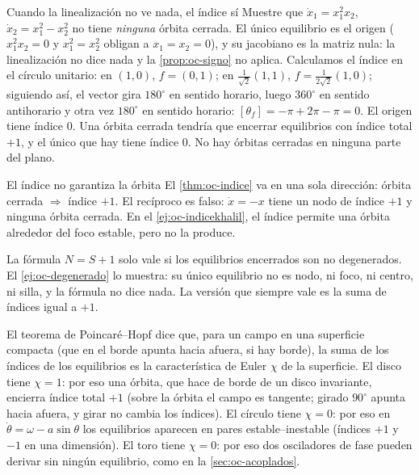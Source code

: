 \begin{ejemplo}[label=ej:oc-degenerado]{Cuando la linealización no ve nada, el índice sí}
Muestre que $\dot x_1=x_1^2x_2$, $\dot x_2=x_1^2-x_2^2$ no tiene \emph{ninguna} órbita cerrada.
\solucion El único equilibrio es el origen ($x_1^2x_2=0$ y $x_1^2=x_2^2$ obligan a $x_1=x_2=0$), y su jacobiano es la matriz nula: la linealización no dice nada y la \cref{prop:oc-signo} no aplica. Calculamos el índice en el círculo unitario: en $(1,0)$, $f=(0,1)$; en $\tfrac1{\sqrt2}(1,1)$, $f=\tfrac1{2\sqrt2}(1,0)$; siguiendo así, el vector gira $180^\circ$ en sentido horario, luego $360^\circ$ en sentido antihorario y otra vez $180^\circ$ en sentido horario: $[\theta_f]=-\pi+2\pi-\pi=0$. El origen tiene índice $0$. Una órbita cerrada tendría que encerrar equilibrios con índice total $+1$, y el único que hay tiene índice $0$. No hay órbitas cerradas en ninguna parte del plano.
\end{ejemplo}


\begin{trampa}[label=tr:oc-indice]{El índice no garantiza la órbita}
El \cref{thm:oc-indice} va en una sola dirección: órbita cerrada $\Rightarrow$ índice $+1$. El recíproco es falso: $\dot x=-x$ tiene un nodo de índice $+1$ y ninguna órbita cerrada. En el \cref{ej:oc-indicekhalil}, el índice permite una órbita alrededor del foco estable, pero no la produce.
\end{trampa}

\begin{cuidado}[La hipótesis de $N=S+1$]
La fórmula $N=S+1$ solo vale si los equilibrios encerrados son no degenerados. El \cref{ej:oc-degenerado} lo muestra: su único equilibrio no es nodo, ni foco, ni centro, ni silla, y la fórmula no dice nada. La versión que siempre vale es la suma de índices igual a $+1$.
\end{cuidado}

\begin{profundiza}
El teorema de Poincaré--Hopf dice que, para un campo en una superficie compacta (que en el borde apunta hacia afuera, si hay borde), la suma de los índices de los equilibrios es la característica de Euler $\chi$ de la superficie. El disco tiene $\chi=1$: por eso una órbita, que hace de borde de un disco invariante, encierra índice total $+1$ (sobre la órbita el campo es tangente; girado $90^\circ$ apunta hacia afuera, y girar no cambia los índices). El círculo tiene $\chi=0$: por eso en $\dot\theta=\omega-a\sin\theta$ los equilibrios aparecen en pares estable--inestable (índices $+1$ y $-1$ en una dimensión). El toro tiene $\chi=0$: por eso dos osciladores de fase pueden derivar sin ningún equilibrio, como en la \cref{sec:oc-acoplados}.
\end{profundiza}
